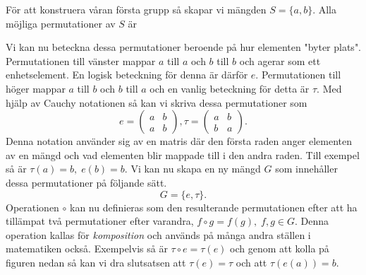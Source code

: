 \documentclass{article}
\theoremstyle{definition}
\begin{document}
För att konstruera våran första grupp så skapar vi mängden $S = \{a, b\}.$
Alla möjliga permutationer av $S$ är 
\begin{center}
\end{center}
Vi kan nu beteckna dessa permutationer beroende på hur elementen "byter plats". Permutationen
till vänster mappar $a$ till $a$ och $b$ till $b$ och agerar som ett enhetselement. En 
logisk beteckning för denna är därför $e$. Permutationen till höger mappar $a$ till $b$ och 
$b$ till $a$ och en vanlig beteckning för detta är $\tau.$ 
Med hjälp av Cauchy notationen så kan vi skriva dessa permutationer som 
\[e = 
\begin{pmatrix}
  a & b \\
  a & b
\end{pmatrix},
\tau = 
\begin{pmatrix}
  a & b \\
  b & a
\end{pmatrix}.
\]
Denna notation använder sig av en matris där den första raden anger elementen av en mängd 
och vad elementen blir mappade till i den andra raden.
Till exempel så är $\tau (a) = b, \; e(b) = b.$
Vi kan nu skapa en ny mängd
$G$ som innehåller dessa permutationer på följande sätt.
\[G = \{e, \tau\}.\]
Operationen $\circ$ kan nu definieras som den resulterande permutationen efter att ha 
tillämpat två permutationer efter varandra, $f \circ g = f(g), \; f, g \in G.$ Denna operation kallas för \textit{komposition} och används på många andra ställen i matematiken också.
Exempelvis så är $\tau \circ e = 
\tau (e)$ och genom att kolla på figuren nedan så kan vi dra slutsatsen att 
$\tau (e) = \tau$ och att $\tau (e(a)) = b.$ 
\end{document}
